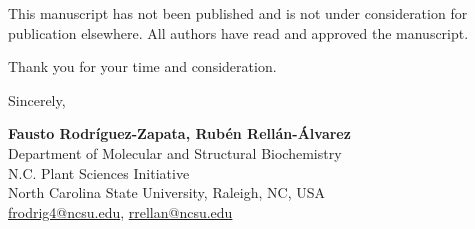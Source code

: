 \documentclass[11pt]{article}
\begin{document}
This manuscript has not been published and is not under consideration for publication elsewhere. All authors have read and approved the manuscript.

Thank you for your time and consideration.

Sincerely,

\vspace{2em}

\textbf{Fausto Rodr\'iguez-Zapata, Rub\'en Rell\'an-\'Alvarez} \\
Department of Molecular and Structural Biochemistry \\
N.C. Plant Sciences Initiative \\
North Carolina State University, Raleigh, NC, USA \\
\href{mailto:frodrig4@ncsu.edu}{frodrig4@ncsu.edu}, \href{mailto:rrellan@ncsu.edu}{rrellan@ncsu.edu}
\end{document}
